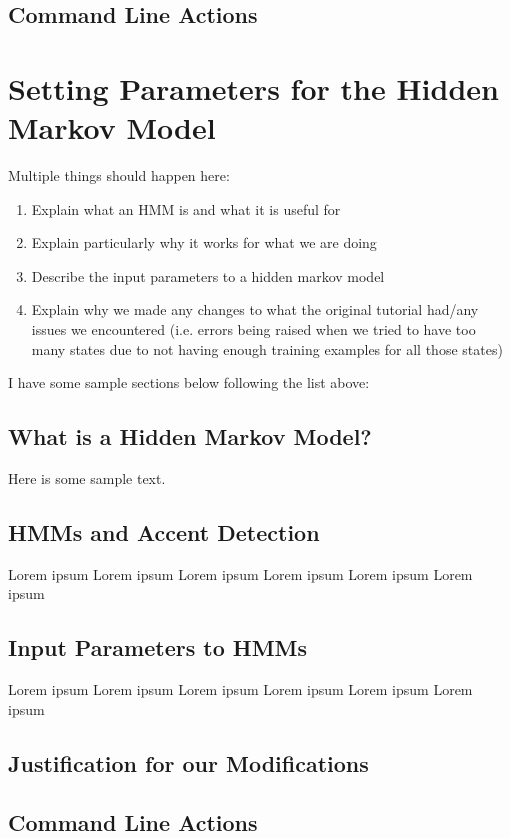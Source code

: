 \documentclass{wileySev}
\begin{document}
\section{Command Line Actions}

\chapter{Setting Parameters for the Hidden Markov Model}
Multiple things should happen here:
\begin{enumerate}
\item Explain what an HMM is and what it is useful for
\item Explain particularly why it works for what we are doing
\item Describe the input parameters to a hidden markov model
\item Explain why we made any changes to what the original tutorial had/any issues we encountered (i.e. errors being raised when we tried to have too many states due to not having enough training examples for all those states)
\end{enumerate}

I have some sample sections below following the list above:

\section{What is a Hidden Markov Model?}
Here is some sample text.

\section{HMMs and Accent Detection}
Lorem ipsum Lorem ipsum Lorem ipsum Lorem ipsum Lorem ipsum Lorem ipsum

\section{Input Parameters to HMMs} 
Lorem ipsum Lorem ipsum Lorem ipsum Lorem ipsum Lorem ipsum Lorem ipsum

\section{Justification for our Modifications}

\section{Command Line Actions}
\end{document}
